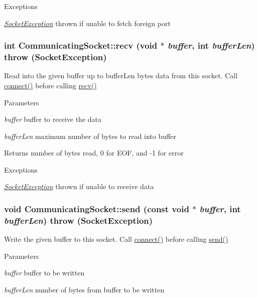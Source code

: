 \begin{DoxyExceptions}{Exceptions}
\item[{\em \hyperlink{classSocketException}{SocketException}}]thrown if unable to fetch foreign port \end{DoxyExceptions}
\hypertarget{classCommunicatingSocket_a7cf1fd470c0060171b68df9f68c7bd01}{
\subsubsection[{recv}]{\setlength{\rightskip}{0pt plus 5cm}int CommunicatingSocket::recv (void $\ast$ {\em buffer}, \/  int {\em bufferLen})  throw ({\bf SocketException})}}
\label{classCommunicatingSocket_a7cf1fd470c0060171b68df9f68c7bd01}
Read into the given buffer up to bufferLen bytes data from this socket. Call \hyperlink{classCommunicatingSocket_a9192374d9baab8e189860aa8d913683c}{connect()} before calling \hyperlink{classCommunicatingSocket_a7cf1fd470c0060171b68df9f68c7bd01}{recv()} 
\begin{DoxyParams}{Parameters}
\item[{\em buffer}]buffer to receive the data \item[{\em bufferLen}]maximum number of bytes to read into buffer \end{DoxyParams}
\begin{DoxyReturn}{Returns}
number of bytes read, 0 for EOF, and -\/1 for error 
\end{DoxyReturn}

\begin{DoxyExceptions}{Exceptions}
\item[{\em \hyperlink{classSocketException}{SocketException}}]thrown if unable to receive data \end{DoxyExceptions}
\hypertarget{classCommunicatingSocket_aca4e86085c064641e86ae24ea29bbb94}{
\subsubsection[{send}]{\setlength{\rightskip}{0pt plus 5cm}void CommunicatingSocket::send (const void $\ast$ {\em buffer}, \/  int {\em bufferLen})  throw ({\bf SocketException})}}
\label{classCommunicatingSocket_aca4e86085c064641e86ae24ea29bbb94}
Write the given buffer to this socket. Call \hyperlink{classCommunicatingSocket_a9192374d9baab8e189860aa8d913683c}{connect()} before calling \hyperlink{classCommunicatingSocket_aca4e86085c064641e86ae24ea29bbb94}{send()} 
\begin{DoxyParams}{Parameters}
\item[{\em buffer}]buffer to be written \item[{\em bufferLen}]number of bytes from buffer to be written \end{DoxyParams}

